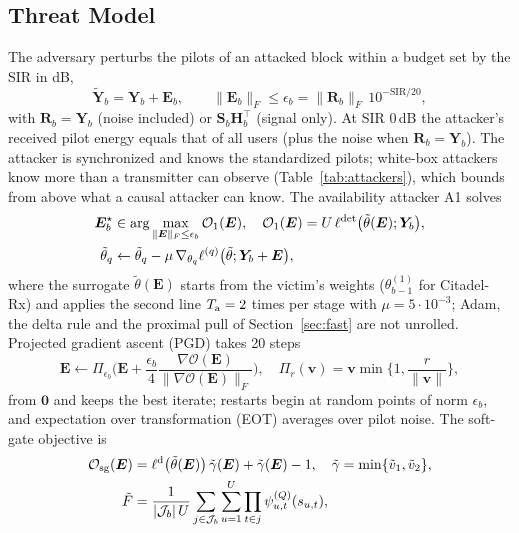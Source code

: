 \documentclass[journal]{IEEEtran}
\theoremstyle{remark}
\begin{document}
\subsection{Threat Model}
The adversary perturbs the pilots of an attacked block within a budget set by the SIR in dB,
\begin{equation}\label{eq:budget}
\tilde{\bm Y}_b=\bm Y_b+\bm E_b,\qquad \|\bm E_b\|_F\le\epsilon_b=\|\bm R_b\|_F\,10^{-\mathrm{SIR}/20},
\end{equation}
with $\bm R_b=\bm Y_b$ (noise included) or $\bm S_b\bm H_b^{\top}$ (signal only). At SIR 0\,dB the
attacker's received pilot energy equals that of all users (plus the noise when $\bm R_b=\bm Y_b$). The attacker is synchronized and knows the
standardized pilots; white-box attackers know more than a transmitter can observe (Table~\ref{tab:attackers}), which bounds from above what a causal attacker can know. The
availability attacker A1 \cite{wu2024} solves
\begin{equation}\label{eq:a1}
\begin{aligned}
\bm E_b^{\star}&\in\arg\max_{\|\bm E\|_F\le\epsilon_b}\mathcal O_1(\bm E),\quad
\mathcal O_1(\bm E)=U\,\ell^{\rm det}\big(\tilde\theta(\bm E);\bm Y_b\big),\\
\tilde\theta_q&\leftarrow\tilde\theta_q-\mu\,\nabla_{\theta_q}\ell^{(q)}\big(\tilde\theta;\bm Y_b+\bm E\big),
\end{aligned}
\end{equation}
where the surrogate $\tilde\theta(\bm E)$ starts from the victim's weights ($\theta^{(1)}_{b-1}$ for
Citadel-Rx) and applies the second line $T_{\rm a}=2$ times per stage with $\mu=5\cdot10^{-3}$; Adam,
the delta rule and the proximal pull of Section~\ref{sec:fast} are not unrolled. Projected gradient
ascent (PGD) \cite{madry2018} takes 20 steps
\begin{equation}\label{eq:pgd}
\bm E\leftarrow\Pi_{\epsilon_b}\!\Big(\bm E+\frac{\epsilon_b}{4}\frac{\nabla\mathcal O(\bm E)}{\|\nabla\mathcal O(\bm E)\|_F}\Big),\quad
\Pi_r(\bm v)=\bm v\min\Big\{1,\frac{r}{\|\bm v\|}\Big\},
\end{equation}
from $\bm 0$ and keeps the best iterate; restarts begin at random points of norm
$\epsilon_b$, and expectation over transformation (EOT) \cite{athalye2018eot} averages over pilot noise.
The soft-gate objective is
\begin{equation}\label{eq:soft}
\begin{aligned}
\mathcal O_{\rm sg}(\bm E)&=\ell^{\rm d}\big(\tilde\theta(\bm E)\big)\,\tilde\gamma(\bm E)+\tilde\gamma(\bm E)-1,\quad
\tilde\gamma=\min\{\tilde v_1,\tilde v_2\},\\
\tilde F&=\frac{1}{|\mathcal J_b|\,U}\sum_{j\in\mathcal J_b}\sum_{u=1}^{U}\prod_{t\in j}\psi^{(Q)}_{u,t}(s_{u,t}),
\end{aligned}
\end{equation}
\end{document}
